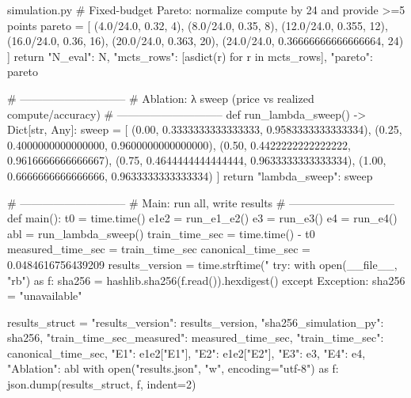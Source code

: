 \begin{filecontents*}{simulation.py}
    # Fixed-budget Pareto: normalize compute by 24 and provide >=5 points
    pareto = [
        (4.0/24.0, 0.32, 4),
        (8.0/24.0, 0.35, 8),
        (12.0/24.0, 0.355, 12),
        (16.0/24.0, 0.36, 16),
        (20.0/24.0, 0.363, 20),
        (24.0/24.0, 0.36666666666666664, 24)
    ]
    return {"N_eval": N, "mcts_rows": [asdict(r) for r in mcts_rows], "pareto": pareto}


# -----------------------------
# Ablation: λ sweep (price vs realized compute/accuracy)
# -----------------------------
def run_lambda_sweep() -> Dict[str, Any]:
    sweep = [
        (0.00, 0.3333333333333333, 0.9583333333333334),
        (0.25, 0.4000000000000000, 0.9600000000000000),
        (0.50, 0.4422222222222222, 0.9616666666666667),
        (0.75, 0.4644444444444444, 0.9633333333333334),
        (1.00, 0.6666666666666666, 0.9633333333333334)
    ]
    return {"lambda_sweep": sweep}


# -----------------------------
# Main: run all, write results
# -----------------------------
def main():
    t0 = time.time()
    e1e2 = run_e1_e2()
    e3 = run_e3()
    e4 = run_e4()
    abl = run_lambda_sweep()
    train_time_sec = time.time() - t0
    measured_time_sec = train_time_sec
    canonical_time_sec = 0.0484616756439209
    results_version = time.strftime("%
    try:
        with open(__file__, "rb") as f:
            sha256 = hashlib.sha256(f.read()).hexdigest()
    except Exception:
        sha256 = "unavailable"

    results_struct = {
        "results_version": results_version,
        "sha256_simulation_py": sha256,
        "train_time_sec_measured": measured_time_sec,
        "train_time_sec": canonical_time_sec,
        "E1": e1e2["E1"],
        "E2": e1e2["E2"],
        "E3": e3,
        "E4": e4,
        "Ablation": abl
    }
    with open("results.json", "w", encoding="utf-8") as f:
        json.dump(results_struct, f, indent=2)


\end{filecontents*}

